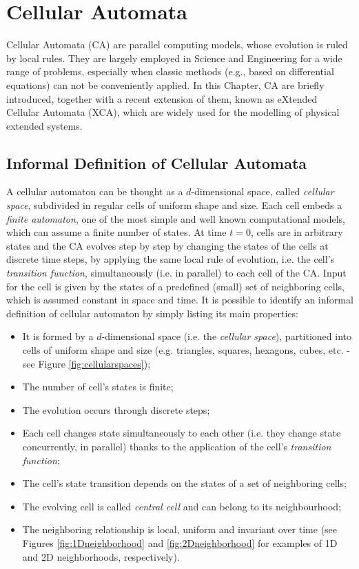 \chapter{Cellular Automata}\label{ch:CA}

Cellular Automata (CA) are parallel computing models, whose evolution
is ruled by local rules. They are largely employed in Science and
Engineering for a wide range of problems, especially when classic
methods (e.g., based on differential equations) can not be conveniently
applied. In this Chapter, CA are briefly introduced, together with a
recent extension of them, known as eXtended Cellular Automata (XCA),
which are widely used for the modelling of physical extended systems.


\section{Informal Definition of Cellular Automata}\label{sec:CAInformaDef}

A cellular automaton can be thought as a $d$-dimensional space, called
\emph{cellular space}, subdivided in regular cells of uniform shape
and size. Each cell embeds a \emph{finite automaton}, one of the most
simple and well known computational models, which can assume a finite
number of states. At time $t=0$, cells are in arbitrary states and the
CA evolves step by step by changing the states of the cells at
discrete time steps, by applying the same local rule of evolution,
i.e. the cell's \emph{transition function}, simultaneously (i.e. in
parallel) to each cell of the CA. Input for the cell is given by the
states of a predefined (small) set of neighboring cells, which is
assumed constant in space and time. It is possible to identify an
informal definition of cellular automaton by simply listing its main
properties:

\begin{itemize}
\item It is formed by a $d$-dimensional space (i.e. the \emph{cellular
  space}), partitioned into cells of uniform shape and size
  (e.g. triangles, squares, hexagons, cubes, etc. - see Figure
  \ref{fig:cellularspaces});
\item The number of cell's states is finite;
\item The evolution occurs through discrete steps;
\item Each cell changes state simultaneously to each other (i.e. they
  change state concurrently, in parallel) thanks to the application of
  the cell's \emph{transition function};
\item The cell's state transition depends on the states of a set of neighboring cells;
\item The evolving cell is called \emph{central cell} and can belong
  to its neighbourhood;
\item The neighboring relationship is local, uniform and invariant
  over time (see Figures \ref{fig:1Dneighborhood} and
  \ref{fig:2Dneighborhood} for examples of 1D and 2D neighborhoods,
  respectively).
\end{itemize}

